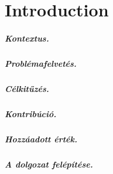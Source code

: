 \setlength{\parindent}{0pt}
\setlength{\parskip}{0.6em}

\chapter{Introduction}
\label{sec:intro}


\paragraph{Kontextus.} 


\paragraph{Problémafelvetés.}


\paragraph{Célkitűzés.}


\paragraph{Kontribúció.}


\paragraph{Hozzáadott érték.}


\paragraph{A dolgozat felépítése.}

